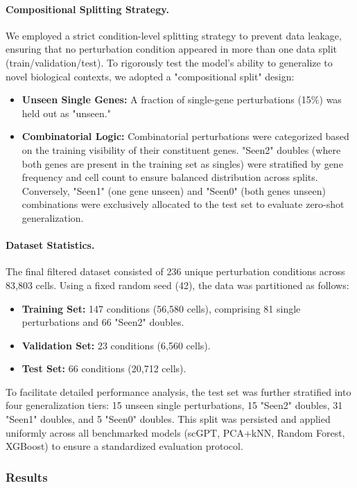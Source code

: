 \documentclass{article}
\begin{document}
\paragraph{Compositional Splitting Strategy.}
We employed a strict condition-level splitting strategy to prevent data leakage, ensuring that no perturbation condition appeared in more than one data split (train/validation/test). To rigorously test the model's ability to generalize to novel biological contexts, we adopted a "compositional split" design:
\begin{itemize}
    \item \textbf{Unseen Single Genes:} A fraction of single-gene perturbations (15\%) was held out as "unseen."
    \item \textbf{Combinatorial Logic:} Combinatorial perturbations were categorized based on the training visibility of their constituent genes. "Seen2" doubles (where both genes are present in the training set as singles) were stratified by gene frequency and cell count to ensure balanced distribution across splits. Conversely, "Seen1" (one gene unseen) and "Seen0" (both genes unseen) combinations were exclusively allocated to the test set to evaluate zero-shot generalization.
\end{itemize}

\paragraph{Dataset Statistics.}
The final filtered dataset consisted of 236 unique perturbation conditions across 83,803 cells. Using a fixed random seed (42), the data was partitioned as follows:
\begin{itemize}
    \item \textbf{Training Set:} 147 conditions (56,580 cells), comprising 81 single perturbations and 66 "Seen2" doubles.
    \item \textbf{Validation Set:} 23 conditions (6,560 cells).
    \item \textbf{Test Set:} 66 conditions (20,712 cells).
\end{itemize}
To facilitate detailed performance analysis, the test set was further stratified into four generalization tiers: 15 unseen single perturbations, 15 "Seen2" doubles, 31 "Seen1" doubles, and 5 "Seen0" doubles. This split was persisted and applied uniformly across all benchmarked models (scGPT, PCA+kNN, Random Forest, XGBoost) to ensure a standardized evaluation protocol. 

\subsubsection{Results}
\end{document}

